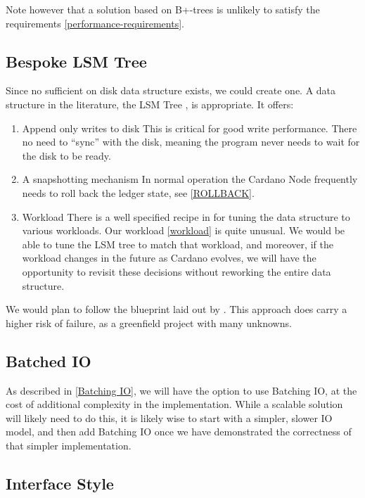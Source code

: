 \documentclass[11pt,a4paper]{article}
\begin{document}
Note however that a solution based on B+-trees is unlikely to satisfy the
requirements \ref{performance-requirements}.

\subsection{Bespoke LSM Tree}

Since no sufficient on disk data structure exists, we could create one. A data
structure in the literature, the LSM Tree \cite{monkey}, is appropriate. It offers:

\begin{enumerate}
  \item Append only writes to disk
        This is critical for good write performance. There no need to ``sync''
        with the disk, meaning the program never needs to wait for the disk to be ready.
  \item A snapshotting mechanism
        In normal operation the Cardano Node frequently needs to roll back the
        ledger state, see \ref{ROLLBACK}.
  \item Workload
        There is a  well specified recipe in \cite{monkey} for tuning  the data
        structure to various workloads. Our workload \ref{workload} is quite unusual. We
        would be able to tune the LSM tree to match that workload, and moreover, if the
        workload changes in the future as Cardano evolves, we will have the opportunity
        to revisit these decisions without reworking the entire data structure.
\end{enumerate}

We would plan to follow the blueprint laid out by \cite{monkey}. This approach
does carry a higher risk of failure, as a greenfield project with many unknowns.

\subsection{Batched IO}
As described in \ref{Batching IO}, we will have the option to use Batching IO,
at the cost of additional complexity in the implementation. While a scalable
solution will likely need to do this, it is likely wise to start with a simpler,
slower IO model, and then add Batching IO once we have demonstrated the
correctness of that simpler implementation.

\subsection{Interface Style}
\end{document}
